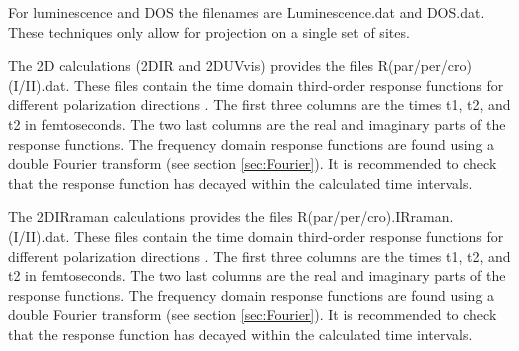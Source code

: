 For luminescence and DOS the filenames are Luminescence.dat and DOS.dat. These
techniques only allow for projection on a single set of sites.


The 2D calculations (2DIR and 2DUVvis) provides the files R(par/per/cro)(I/II).dat.
These files contain the time domain third-order response functions for different
polarization directions \cite{Hochstrasser.2001.CP.266.273,Zanni.2001.PNAS.98.11265}.
The first three columns are the times t1, t2, and t2 in femtoseconds.
The two last columns are the real and imaginary parts of the response functions.
The frequency domain response functions are found using a double Fourier transform
(see section \ref{sec:Fourier}). It is recommended to check that the response function
has decayed within the calculated time intervals.

The 2DIRraman calculations provides the files R(par/per/cro).IRraman.(I/II).dat.
These files contain the time domain third-order response functions for different
polarization directions \cite{Hochstrasser.2001.CP.266.273,Zanni.2001.PNAS.98.11265}.
The first three columns are the times t1, t2, and t2 in femtoseconds.
The two last columns are the real and imaginary parts of the response functions.
The frequency domain response functions are found using a double Fourier transform
(see section \ref{sec:Fourier}). It is recommended to check that the response function
has decayed within the calculated time intervals. 


